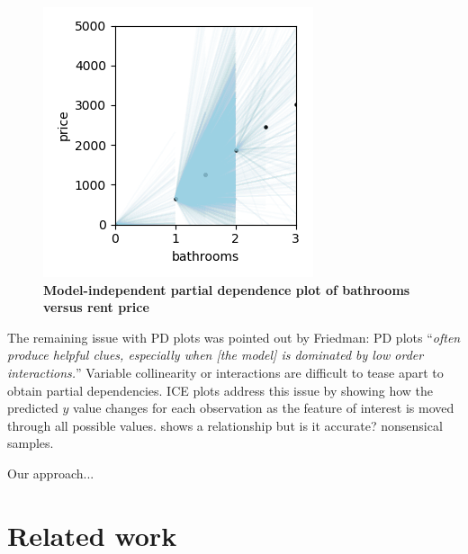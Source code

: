 \documentclass[12pt]{article}
\newcommand{\cut}[1]{}
\begin{document}
\begin{figure}[htbp]
\begin{center}
\includegraphics[scale=0.7]{images/baths_vs_price_mipd.png}
\caption{{\bf  Model-independent partial dependence plot of bathrooms versus rent price}}
\label{fig:baths_price_mipd}
\end{center}
\end{figure}

The remaining issue with PD plots was pointed out by Friedman: PD plots ``{\em often produce helpful clues, especially when {\em [the model]} is dominated by low order interactions.}'' Variable collinearity or interactions are difficult to tease apart to obtain partial dependencies.  ICE plots address this issue by showing how the predicted $y$ value changes for each observation as the feature of interest is moved through all possible values. shows a relationship but is it accurate? nonsensical samples.

\cut{
separate but related problems: {\em (i)} collinearity between features and {\em (ii)} y being a function of interaction between features, such as implicit $x_1x_2$ terms. 
 


since we care most about how y changes per changes in $x_i$, absolute plots are less useful than relative plots; compare with centered ICE, which I also don't like.



define what we are actually looking for: controlling for other variables or net effect. All other features being equal. partial derivative.}

Our approach...

\section{Related work}
\end{document}
